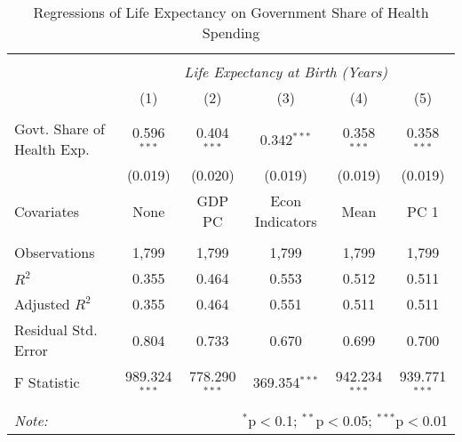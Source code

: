 \begin{table}[!htbp] \centering
  \caption{Regressions of Life Expectancy on Government Share of Health Spending \label{main_regs}}
\begin{tabular}{@{\extracolsep{5pt}}lccccc}
\\[-1.8ex]\hline
\hline \\[-1.8ex]
& \multicolumn{5}{c}{\textit{Life Expectancy at Birth (Years)}} \
\cr \
\\[-1.8ex] & (1) & (2) & (3) & (4) & (5) \\
\hline \\[-1.8ex]
 Govt. Share of Health Exp. & 0.596$^{***}$ & 0.404$^{***}$ & 0.342$^{***}$ & 0.358$^{***}$ & 0.358$^{***}$ \\
  & (0.019) & (0.020) & (0.019) & (0.019) & (0.019) \\
 Covariates & None & GDP PC & Econ Indicators & Mean & PC 1 \\
\hline \\[-1.8ex]
 Observations & 1,799 & 1,799 & 1,799 & 1,799 & 1,799 \\
 $R^2$ & 0.355 & 0.464 & 0.553 & 0.512 & 0.511 \\
 Adjusted $R^2$ & 0.355 & 0.464 & 0.551 & 0.511 & 0.511 \\
 Residual Std. Error & 0.804 & 0.733 & 0.670 & 0.699 & 0.700  \\
 F Statistic & 989.324$^{***}$  & 778.290$^{***}$  & 369.354$^{***}$  & 942.234$^{***}$  & 939.771$^{***}$  \\
\hline
\hline \\[-1.8ex]
\textit{Note:} & \multicolumn{5}{r}{$^{*}$p$<$0.1; $^{**}$p$<$0.05; $^{***}$p$<$0.01} \\
\end{tabular}
\end{table}